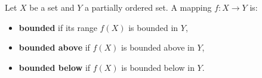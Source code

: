 Let $X$ be a set and $Y$ a partially ordered set. A mapping $f : X \to Y$ is:
\begin{itemize}
\item \textbf{bounded} if its range $f(X)$ is bounded in $Y$,
\item \textbf{bounded above} if $f(X)$ is bounded above in $Y$,
\item \textbf{bounded below} if $f(X)$ is bounded below in $Y$.
\end{itemize}
